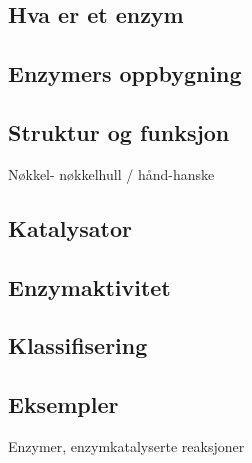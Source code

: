 \subsection{Hva er et enzym}

\subsection{Enzymers oppbygning}

\subsection{Struktur og funksjon}
    Nøkkel- nøkkelhull / hånd-hanske

\subsection{Katalysator}

\subsection{Enzymaktivitet}

\subsection{Klassifisering}

\subsection{Eksempler}
    Enzymer, enzymkatalyserte reaksjoner
